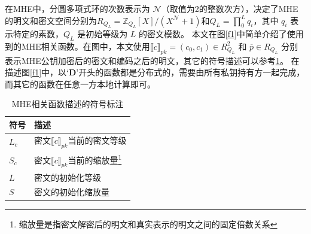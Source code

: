 在MHE中，分圆多项式环的次数表示为 $\mathcal{N}$（取值为2的整数次方），决定了MHE的明文和密文空间分别为$R_{Q_{L}}=\mathbb{Z}_{Q_{L}}[X]/(X^{\mathcal{N}}+1)$和$Q_{L}=\prod_{0}^{L}q_i$，其中 $q_i$ 表示特定的素数，$Q_L$ 是初始等级为 $L$ 的密文模数。
本文在图\ref{f1}中简单介绍了使用到的MHE相关函数。在图中，本文使用$\llbracket c\rrbracket_{pk}=(c_0,c_1)\in R^2_{Q_{L}}$ 和 $\overline{p}\in R_{Q_{L}}$ 分别表示MHE公钥加密后的密文和编码之后的明文，其它的符号描述可以参考\ref{tab:symbol}。
在描述图\ref{f1}中，以$‘\textbf{D}’$开头的函数都是分布式的，需要由所有私钥持有方一起完成，而其它的函数在任意一方本地计算即可。

\begin{table}[htbp]
	\centering
	\caption{MHE相关函数描述的符号标注}
	\label{tab:symbol}
	\begin{minipage}[t]{0.6\linewidth}
		\begin{tabular*}{\linewidth}{lp{10cm}}
			\toprule[1.5pt]
			{\hei 符号} & {\hei 描述}\\
			\midrule[1pt]
			$L_c$ & 密文$\llbracket c\rrbracket_{pk}$当前的密文等级 \\ 
			$S_c$ & 密文$\llbracket c\rrbracket_{pk}$当前的缩放量\footnote{缩放量是指密文解密后的明文和真实表示的明文之间的固定倍数关系} \\
			$L$ & 密文的初始化等级\\
			$S$ & 密文的初始化缩放量\\
			\bottomrule[1.5pt]
		\end{tabular*}
	\end{minipage}
\end{table}

